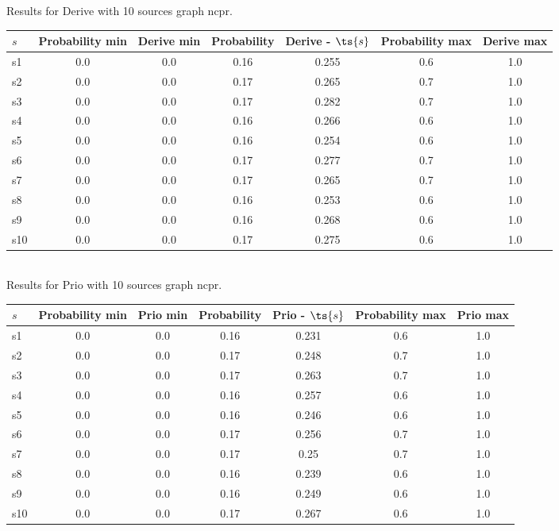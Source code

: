 \documentclass{article}
\begin{document}
\noindent Results for Derive with 10 sources graph ncpr.

\noindent\begin{tabular}{|l|c|c|c|c|c|c|}
\hline
$s$& Probability min & Derive min & Probability & Derive - $\ts{s}$ & Probability max & Derive max\\
\hline
s1 &0.0 & 0.0 & 0.16 & 0.255 & 0.6 & 1.0\\
\hline
s2 &0.0 & 0.0 & 0.17 & 0.265 & 0.7 & 1.0\\
\hline
s3 &0.0 & 0.0 & 0.17 & 0.282 & 0.7 & 1.0\\
\hline
s4 &0.0 & 0.0 & 0.16 & 0.266 & 0.6 & 1.0\\
\hline
s5 &0.0 & 0.0 & 0.16 & 0.254 & 0.6 & 1.0\\
\hline
s6 &0.0 & 0.0 & 0.17 & 0.277 & 0.7 & 1.0\\
\hline
s7 &0.0 & 0.0 & 0.17 & 0.265 & 0.7 & 1.0\\
\hline
s8 &0.0 & 0.0 & 0.16 & 0.253 & 0.6 & 1.0\\
\hline
s9 &0.0 & 0.0 & 0.16 & 0.268 & 0.6 & 1.0\\
\hline
s10 &0.0 & 0.0 & 0.17 & 0.275 & 0.6 & 1.0\\
\hline
\end{tabular}\\

\noindent Results for Prio with 10 sources graph ncpr.

\noindent\begin{tabular}{|l|c|c|c|c|c|c|}
\hline
$s$& Probability min & Prio min & Probability & Prio - $\ts{s}$ & Probability max & Prio max\\
\hline
s1 &0.0 & 0.0 & 0.16 & 0.231 & 0.6 & 1.0\\
\hline
s2 &0.0 & 0.0 & 0.17 & 0.248 & 0.7 & 1.0\\
\hline
s3 &0.0 & 0.0 & 0.17 & 0.263 & 0.7 & 1.0\\
\hline
s4 &0.0 & 0.0 & 0.16 & 0.257 & 0.6 & 1.0\\
\hline
s5 &0.0 & 0.0 & 0.16 & 0.246 & 0.6 & 1.0\\
\hline
s6 &0.0 & 0.0 & 0.17 & 0.256 & 0.7 & 1.0\\
\hline
s7 &0.0 & 0.0 & 0.17 & 0.25 & 0.7 & 1.0\\
\hline
s8 &0.0 & 0.0 & 0.16 & 0.239 & 0.6 & 1.0\\
\hline
s9 &0.0 & 0.0 & 0.16 & 0.249 & 0.6 & 1.0\\
\hline
s10 &0.0 & 0.0 & 0.17 & 0.267 & 0.6 & 1.0\\
\hline
\end{tabular}\\
\end{document}
